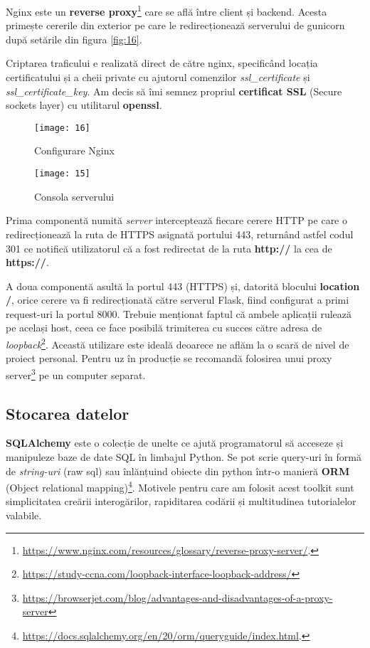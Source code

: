 Nginx este un \textbf{reverse proxy}\footnote{\url{https://www.nginx.com/resources/glossary/reverse-proxy-server/}.} care se află între client și backend. Acesta primește cererile din exterior pe care le redirecționează serverului de gunicorn după setările din figura \ref{fig:16}.

Criptarea traficului e realizată direct de către nginx, specificând locația certificatului și a cheii private cu ajutorul comenzilor \emph{ssl\_certificate} și \emph{ssl\_certificate\_key}. Am decis să îmi semnez propriul \textbf{certificat SSL} (Secure sockets layer) cu utilitarul \textbf{openssl}.

\begin{figure}[h]
	\centering
	\begin{minipage}{0.45\textwidth}
		\centering
		\texttt{[image: 16]}
		\caption{Configurare Nginx}
		\label{fig:16}
	\end{minipage}
	\hfill
	\begin{minipage}{0.45\textwidth}
		\centering
		\texttt{[image: 15]}
		\caption{Consola serverului}
		\label{fig:15}
	\end{minipage}
\end{figure}

Prima componentă numită \emph{server} interceptează fiecare cerere HTTP pe care o redirecționează la ruta de HTTPS asignată portului 443, returnând astfel codul 301 ce notifică utilizatorul că a fost redirectat de la ruta \textbf{http://} la cea de \textbf{https://}.

A doua componentă asultă la portul 443 (HTTPS) și, datorită blocului \textbf{location /}, orice cerere va fi redirecționată către serverul Flask, fiind configurat a primi request-uri la portul 8000. Trebuie menționat faptul că ambele aplicații rulează pe același host, ceea ce face posibilă trimiterea cu succes către adresa de \emph{loopback}\footnote{\url{https://study-ccna.com/loopback-interface-loopback-address/}}. Această utilizare este ideală deoarece ne aflăm la o scară de nivel de proiect personal. Pentru uz în producție se recomandă folosirea unui proxy server\footnote{\url{https://browserjet.com/blog/advantages-and-disadvantages-of-a-proxy-server}} pe un computer separat.

\subsection{Stocarea datelor}

\textbf{SQLAlchemy} este o colecție de unelte ce ajută programatorul să acceseze și manipuleze baze de date SQL în limbajul Python. Se pot scrie query-uri în formă de \emph{string-uri} (raw sql) sau înlănțuind obiecte din python într-o manieră \textbf{ORM} (Object relational mapping)\footnote{\url{https://docs.sqlalchemy.org/en/20/orm/queryguide/index.html}.}. Motivele pentru care am folosit acest toolkit sunt simplicitatea creării interogărilor, rapiditarea codării și multitudinea tutorialelor valabile.

